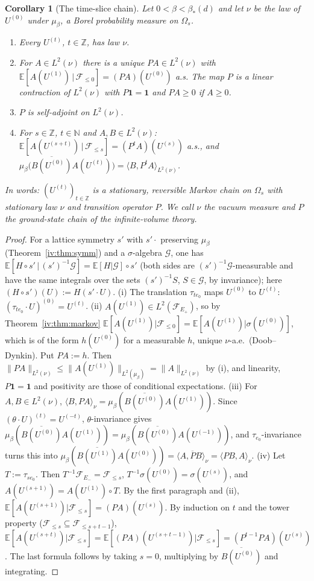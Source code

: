 \documentclass[11pt,a4paper]{article}
\newtheorem{corollary}[theorem]{Corollary}
\theoremstyle{definition}
\theoremstyle{remark}
\newcommand{\Z}{\mathbb{Z}}
\newcommand{\N}{\mathbb{N}}
\newcommand{\E}{\mathbb{E}}
\newcommand{\cF}{\mathcal{F}}
\newcommand{\ip}[2]{\langle #1,#2\rangle}
\newcommand{\norm}[1]{\lVert #1\rVert}
\newcommand{\bS}{\beta_*}
\begin{document}
\begin{corollary}[The time-slice chain]\label{iv:cor:chain}
Let $0<\beta<\bS(d)$ and let $\nu$ be the law of $U^{(0)}$ under $\mu_\beta$, a Borel probability measure on $\Omega_s$.
\begin{enumerate}[label=(\roman*)]
\item Every $U^{(t)}$, $t\in\Z$, has law $\nu$.
\item For $A\in L^2(\nu)$ there is a unique $PA\in L^2(\nu)$ with $\E[A(U^{(1)})\,|\,\cF_{\le0}]=(PA)(U^{(0)})$ a.s. The map $P$ is
a linear contraction of $L^2(\nu)$ with $P\mathbf 1=\mathbf 1$ and $PA\ge0$ if $A\ge0$.
\item $P$ is self-adjoint on $L^2(\nu)$.
\item For $s\in\Z$, $t\in\N$ and $A,B\in L^2(\nu)$: $\E[A(U^{(s+t)})\,|\,\cF_{\le s}]=(P^tA)(U^{(s)})$ a.s., and
$\mu_\beta\bigl(\overline{B(U^{(0)})}A(U^{(t)})\bigr)=\ip B{P^tA}_{L^2(\nu)}$.
\end{enumerate}
In words: $(U^{(t)})_{t\in\Z}$ is a stationary, reversible Markov chain on $\Omega_s$ with stationary law $\nu$ and transition
operator $P$. We call $\nu$ the \emph{vacuum measure} and $P$ the \emph{ground-state chain} of the infinite-volume theory.
\end{corollary}

\begin{proof}
For a lattice symmetry $s'$ with $s'\cdot$ preserving $\mu_\beta$ (Theorem~\ref{iv:thm:symm}) and a $\sigma$-algebra $\mathcal G$,
one has $\E[H\circ s'\,|\,(s')^{-1}\mathcal G]=\E[H|\mathcal G]\circ s'$ (both sides are $(s')^{-1}\mathcal G$-measurable and have the
same integrals over the sets $(s')^{-1}S$, $S\in\mathcal G$, by invariance); here $(H\circ s')(U):=H(s'\cdot U)$.
(i) The translation $\tau_{te_0}$ maps $U^{(0)}$ to $U^{(t)}$: $(\tau_{te_0}\cdot U)^{(0)}=U^{(t)}$.
(ii) $A(U^{(1)})\in L^2(\cF_{E_+})$, so by Theorem~\ref{iv:thm:markov} $\E[A(U^{(1)})|\cF_{\le0}]=\E[A(U^{(1)})|\sigma(U^{(0)})]$, which
is of the form $h(U^{(0)})$ for a measurable $h$, unique $\nu$-a.e.\ (Doob--Dynkin). Put $PA:=h$. Then
$\norm{PA}_{L^2(\nu)}\le\norm{A(U^{(1)})}_{L^2(\mu_\beta)}=\norm A_{L^2(\nu)}$ by (i), and linearity, $P\mathbf 1=\mathbf 1$ and positivity
are those of conditional expectations.
(iii) For $A,B\in L^2(\nu)$, $\ip B{PA}_\nu=\mu_\beta(\overline{B(U^{(0)})}A(U^{(1)}))$. Since $(\theta\cdot U)^{(t)}=U^{(-t)}$,
$\theta$-invariance gives $\mu_\beta(\overline{B(U^{(0)})}A(U^{(1)}))=\mu_\beta(\overline{B(U^{(0)})}A(U^{(-1)}))$, and
$\tau_{e_0}$-invariance turns this into $\mu_\beta(\overline{B(U^{(1)})}A(U^{(0)}))=\overline{\ip A{PB}_\nu}=\ip{PB}A_\nu$.
(iv) Let $T:=\tau_{se_0}$. Then $T^{-1}\cF_{E_-}=\cF_{\le s}$, $T^{-1}\sigma(U^{(0)})=\sigma(U^{(s)})$, and $A(U^{(s+1)})=A(U^{(1)})\circ T$.
By the first paragraph and (ii), $\E[A(U^{(s+1)})|\cF_{\le s}]=(PA)(U^{(s)})$. By induction on $t$ and the tower property
($\cF_{\le s}\subseteq\cF_{\le s+t-1}$),
$\E[A(U^{(s+t)})|\cF_{\le s}]=\E[(PA)(U^{(s+t-1)})|\cF_{\le s}]=(P^{t-1}PA)(U^{(s)})$. The last formula follows by taking $s=0$,
multiplying by $\overline{B(U^{(0)})}$ and integrating.
\end{proof}
\end{document}
